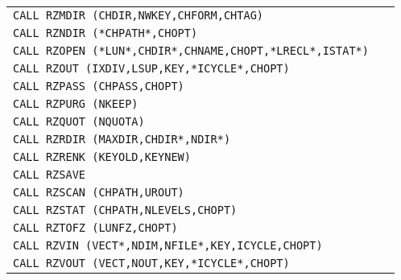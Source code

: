 {\begin{Tabhere}
\begin{center}
\begin{tabular}{|>{\tt}l@{\quad}r|}
CALL RZMDIR (CHDIR,NWKEY,CHFORM,CHTAG)                   & \pageref{RZMDIR} \\  
CALL RZNDIR (*CHPATH*,CHOPT)                             & \pageref{RZNDIR} \\  
CALL RZOPEN (*LUN*,CHDIR*,CHNAME,CHOPT,*LRECL*,ISTAT*)   & \pageref{RZOPEN} \\  
CALL RZOUT (IXDIV,LSUP,KEY,*ICYCLE*,CHOPT)               & \pageref{RZOUT}  \\  
CALL RZPASS (CHPASS,CHOPT)                               & \pageref{RZPASS} \\  
CALL RZPURG (NKEEP)                                      & \pageref{RZPURG} \\  
CALL RZQUOT (NQUOTA)                                     & \pageref{RZQUOT} \\  
CALL RZRDIR (MAXDIR,CHDIR*,NDIR*)                        & \pageref{RZRDIR} \\  
CALL RZRENK (KEYOLD,KEYNEW)                              & \pageref{RZRENK} \\  
CALL RZSAVE                                              & \pageref{RZSAVE} \\  
CALL RZSCAN (CHPATH,UROUT)                               & \pageref{RZSCAN} \\  
CALL RZSTAT (CHPATH,NLEVELS,CHOPT)                       & \pageref{RZSTAT} \\  
CALL RZTOFZ (LUNFZ,CHOPT)                                & \pageref{RZTOFZ} \\  
CALL RZVIN (VECT*,NDIM,NFILE*,KEY,ICYCLE,CHOPT)          & \pageref{RZVIN}  \\  
CALL RZVOUT (VECT,NOUT,KEY,*ICYCLE*,CHOPT)               & \pageref{RZVOUT} \\  
\hline
\end{tabular}
\end{center}
\end{Tabhere}
}



